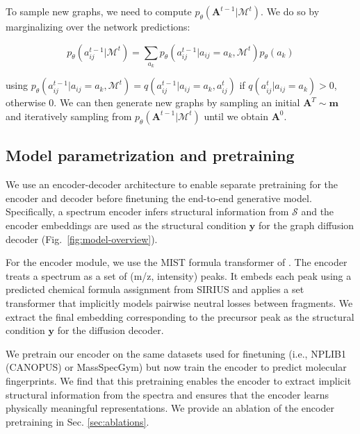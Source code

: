 \documentclass{article}
\theoremstyle{plain}
\theoremstyle{definition}
\theoremstyle{remark}
\begin{document}
To sample new graphs, we need to compute $p_{\theta}\left(\mathbf{A}^{t-1} | \mathcal{M}^t\right)$. We 
 do so by marginalizing over the network predictions:

\begin{equation}
    p_{\theta}\left(a_{ij}^{t-1} | \mathcal{M}^t\right) = \sum_{a_k}p_{\theta}\left(a_{ij}^{t-1} | a_{ij} = a_k, \mathcal{M}^t\right)p_{\theta}(a_k)
\end{equation}

using $p_{\theta}\left(a_{ij}^{t-1} | a_{ij} = a_k, \mathcal{M}^t\right) = q\left(a_{ij}^{t-1} | a_{ij}=a_k, a_{ij}^t\right)$ if $q\left(a_{ij}^t | a_{ij}=a_k\right) > 0$, otherwise $0$. We can then generate new graphs by sampling an initial $\mathbf{A}^T \sim \bm{m}$ and iteratively sampling from $p_{\theta}\left(\mathbf{A}^{t-1} | \mathcal{M}^t\right)$ until we obtain $\mathbf{A}^0$.%

\subsection{Model parametrization and pretraining}

We use an encoder-decoder architecture to enable separate pretraining for the encoder and decoder before finetuning the end-to-end generative model. Specifically, a spectrum encoder infers  structural information from $\mathcal{S}$ and the encoder embeddings are used as the structural condition $\mathbf{y}$ for the graph diffusion decoder (Fig.~\ref{fig:model-overview}). 

For the encoder module, we use the MIST formula transformer of \citet{goldman2023mist}. The encoder treats a spectrum as a set of (m/z, intensity) peaks. It embeds each peak using a predicted chemical formula assignment from SIRIUS and applies a set transformer that implicitly models pairwise neutral losses between fragments. We extract the final embedding corresponding to the precursor peak as the structural condition $\mathbf{y}$ for the diffusion decoder.  

We pretrain our encoder on the same datasets used for finetuning (i.e., NPLIB1 (CANOPUS) or MassSpecGym) but now train the encoder to predict molecular fingerprints. We find that this pretraining enables the encoder to extract implicit structural information from the spectra and ensures that the encoder learns physically meaningful representations. We provide an ablation of the encoder pretraining in Sec. \ref{sec:ablations}.
\end{document}
